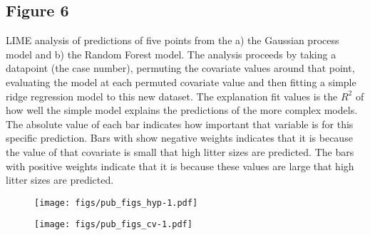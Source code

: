 \documentclass[12pt]{article}
\begin{document}
\subsection{Figure 6}
LIME analysis of predictions of five points from the a) the Gaussian process model and b) the Random Forest model.
The analysis proceeds by taking a datapoint (the case number), permuting the covariate values around that point, evaluating the model at each permuted covariate value and then fitting a simple ridge regression model to this new dataset.
The explanation fit values is the $R^2$ of how well the simple model explains the predictions of the more complex models.
The absolute value of each bar indicates how important that variable is for this specific prediction.
Bars with show negative weights indicates that it is because the value of that covariate is small that high litter sizes are predicted.
The bars with positive weights indicate that it is because these values are large that high litter sizes are predicted.

\clearpage


\begin{figure}[h!]
  \centering
	\texttt{[image: figs/pub\_figs\_hyp-1.pdf]}  
  \caption{
  }
  \label{fig:hyp}
\end{figure}


\begin{figure}[h!]
  \centering
\texttt{[image: figs/pub\_figs\_cv-1.pdf]}  \caption{
  }
    \label{fig:predobs}
\end{figure}
\end{document}
